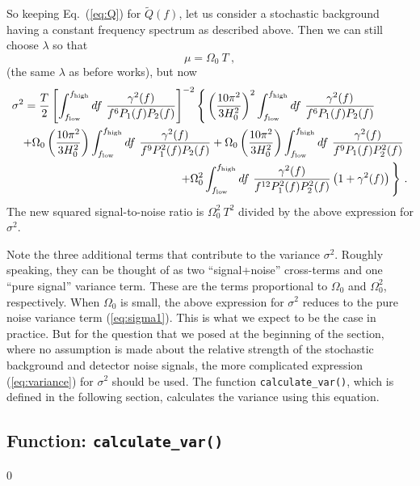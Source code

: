 So keeping Eq.~(\ref{eq:Q}) for $\tilde Q(f)$, let us consider a 
stochastic background having a constant frequency spectrum as described
above.
Then we can still choose $\lambda$ so that
%
\begin{equation}
\mu=\Omega_0\ T\ ,
\end{equation}
%
(the same $\lambda$ as before works), but now
%
%
\begin{eqnarray}
\lefteqn{
\sigma^2={T\over 2}\left[
\int_{f_{\rm low}}^{f_{\rm high}} df\ 
{\gamma^2(f)\over f^6 P_1(f) P_2(f)}
\right]^{-2}
\Bigg\{\left({10\pi^2\over 3 H_0^2}\right)^2
\int_{f_{\rm low}}^{f_{\rm high}} 
df\ {\gamma^2(f)\over f^6 P_1(f) P_2(f)}}
\nonumber\\ 
&&+\Omega_0\left({10\pi^2\over 3 H_0^2}\right)
\int_{f_{\rm low}}^{f_{\rm high}} df\ 
{\gamma^2(f)\over f^9 P^2_1(f) P_2(f)}
  +\Omega_0\left({10\pi^2\over 3 H_0^2}\right)
\int_{f_{\rm low}}^{f_{\rm high}} df\ 
{\gamma^2(f)\over f^9 P_1(f) P^2_2(f)}\ 
\nonumber\\
&&+\Omega_0^2 
\int_{f_{\rm low}}^{f_{\rm high}} df\ 
{\gamma^2(f)\over f^{12} P^2_1(f) P^2_2(f)}
\left(1+\gamma^2(f)\right)\Bigg\}\ .
\label{eq:variance}
\end{eqnarray}
%
The new squared signal-to-noise ratio is $\Omega_0^2\ T^2$ 
divided by the above expression for $\sigma^2$.

Note the three additional terms that contribute to the variance
$\sigma^2$.
Roughly speaking, they can be thought of as two ``signal+noise'' 
cross-terms and one ``pure signal'' variance term.
These are the terms proportional to $\Omega_0$ and $\Omega_0^2$, 
respectively.
When $\Omega_0$ is small, the above expression for $\sigma^2$ 
reduces to the pure noise variance term (\ref{eq:sigma1}). 
This is what we expect to be the case in practice.
But for the question that we posed at the beginning of the section,
where no assumption is made about the relative strength of the
stochastic background and detector noise signals, the more complicated
expression (\ref{eq:variance}) for $\sigma^2$ should be used.
The function {\tt calculate\_var()}, which is defined in the 
following section, calculates the variance using this equation.

\clearpage

\subsection{Function: {\tt calculate\_var()}}
\label{subsec:calculate_var}
\setcounter{equation}0

